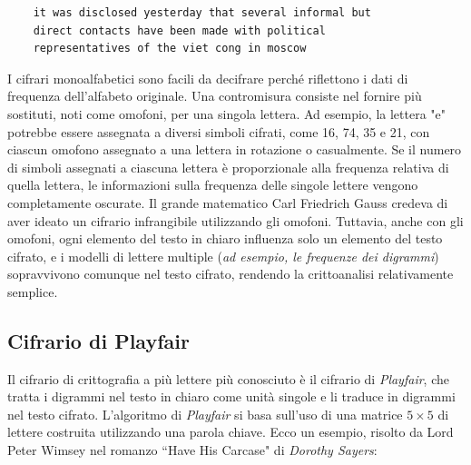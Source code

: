 \begin{verbatim}
    it was disclosed yesterday that several informal but
    direct contacts have been made with political
    representatives of the viet cong in moscow
\end{verbatim}

I cifrari monoalfabetici sono facili da decifrare perché riflettono i dati di frequenza
dell'alfabeto originale. Una contromisura consiste nel fornire più sostituti, noti come omofoni,
per una singola lettera. Ad esempio, la lettera "e" potrebbe essere assegnata a diversi simboli
cifrati, come 16, 74, 35 e 21, con ciascun omofono assegnato a una lettera in rotazione o casualmente.
Se il numero di simboli assegnati a ciascuna lettera è proporzionale alla frequenza relativa di
quella lettera, le informazioni sulla frequenza delle singole lettere vengono completamente oscurate.
Il grande matematico Carl Friedrich Gauss credeva di aver ideato un cifrario infrangibile utilizzando
gli omofoni. Tuttavia, anche con gli omofoni, ogni elemento del testo in chiaro influenza
solo un elemento del testo cifrato, e i modelli di lettere multiple (\textit{ad esempio, le frequenze
dei digrammi}) sopravvivono comunque nel testo cifrato, rendendo la crittoanalisi relativamente semplice.

\subsection{Cifrario di Playfair}
Il cifrario di crittografia a più lettere più conosciuto è il cifrario di
\textit{Playfair}, che tratta i digrammi nel testo in chiaro come unità singole e li traduce
in digrammi nel testo cifrato. L'algoritmo di \textit{Playfair} si basa sull'uso di una matrice $5 \times 5$
di lettere costruita utilizzando una parola chiave. Ecco un esempio, risolto da Lord Peter Wimsey nel
romanzo ``Have His Carcase" di \textit{Dorothy Sayers}:

